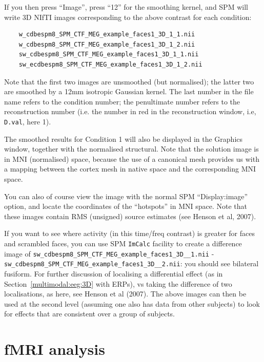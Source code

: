 If you then press ``Image'', press ``12'' for the smoothing kernel, and SPM will write 3D NIfTI images corresponding to the above contrast for each condition:

\begin{verbatim}
    w_cdbespm8_SPM_CTF_MEG_example_faces1_3D_1_1.nii
    w_cdbespm8_SPM_CTF_MEG_example_faces1_3D_1_2.nii
    sw_cdbespm8_SPM_CTF_MEG_example_faces1_3D_1_1.nii
    sw_ecdbespm8_SPM_CTF_MEG_example_faces1_3D_1_2.nii
\end{verbatim}

Note that the first two images are unsmoothed (but normalised); the latter two are smoothed by a 12mm isotropic Gaussian kernel. The last number in the file name refers to the condition number; the penultimate number refers to the reconstruction number (i.e. the number in red in the reconstruction window, i.e, \texttt{D.val}, here 1).

The smoothed results for Condition 1 will also be displayed in the Graphics window, together with the normalised structural. Note that the solution image is in MNI (normalised) space, because the use of a canonical mesh provides us with a mapping between the cortex mesh in native space and the corresponding MNI space.

You can also of course view the image with the normal SPM ``Display:image'' option, and locate the coordinates of the ``hotspots'' in MNI space. Note that these images contain RMS (unsigned) source estimates (see Henson et al, 2007).

If you want to see where activity (in this time/freq contrast) is greater for faces and scrambled faces, you can use SPM \texttt{ImCalc} facility to create a difference image of \texttt{sw\_\-cdbespm8\_\-SPM\_\-CTF\_\-MEG\_\-example\_\-faces1\_\-3D\_\_\-1.nii} - \texttt{sw\_\-cdbespm8\_\-SPM\_\-CTF\_\-MEG\_\-example\_\-faces1\_\-3D\_\_\-2.nii}: you should see bilateral fusiform. For further discussion of localising a differential effect (as in Section~\ref{multimodal:eeg:3D} with ERPs), vs taking the difference of two localisations, as here, see Henson et al (2007). The above images can then be used at the second level (assuming one also has data from other subjects) to look for effects that are consistent over a group of subjects.



\section{fMRI analysis \label{multimodal:data:fMRI}}

